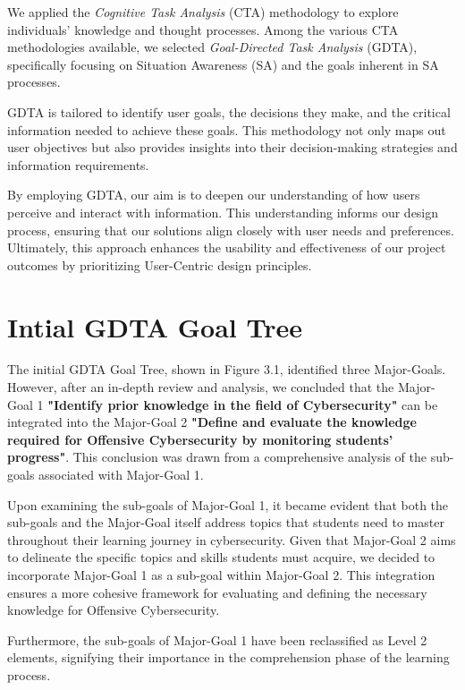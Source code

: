 We applied the \textit{Cognitive Task Analysis} (CTA) methodology to explore individuals' knowledge and thought processes. Among the various CTA methodologies available, we selected \textit{Goal-Directed Task Analysis} (GDTA), specifically focusing on Situation Awareness (SA) and the goals inherent in SA processes.

GDTA is tailored to identify user goals, the decisions they make, and the critical information needed to achieve these goals. This methodology not only maps out user objectives but also provides insights into their decision-making strategies and information requirements.

By employing GDTA, our aim is to deepen our understanding of how users perceive and interact with information. This understanding informs our design process, ensuring that our solutions align closely with user needs and preferences. Ultimately, this approach enhances the usability and effectiveness of our project outcomes by prioritizing User-Centric design principles.

\section{Intial GDTA Goal Tree}
The initial GDTA Goal Tree, shown in Figure 3.1, identified three Major-Goals. However, after an in-depth review and analysis, we concluded that the Major-Goal 1 \textbf{"Identify prior knowledge in the field of Cybersecurity"} can be integrated into the Major-Goal 2 \textbf{"Define and evaluate the knowledge required for Offensive Cybersecurity by monitoring students' progress"}. This conclusion was drawn from a comprehensive analysis of the sub-goals associated with Major-Goal 1.

Upon examining the sub-goals of Major-Goal 1, it became evident that both the sub-goals and the Major-Goal itself address topics that students need to master throughout their learning journey in cybersecurity. Given that Major-Goal 2 aims to delineate the specific topics and skills students must acquire, we decided to incorporate Major-Goal 1 as a sub-goal within Major-Goal 2. This integration ensures a more cohesive framework for evaluating and defining the necessary knowledge for Offensive Cybersecurity.

Furthermore, the sub-goals of Major-Goal 1 have been reclassified as Level 2 elements, signifying their importance in the comprehension phase of the learning process. 

